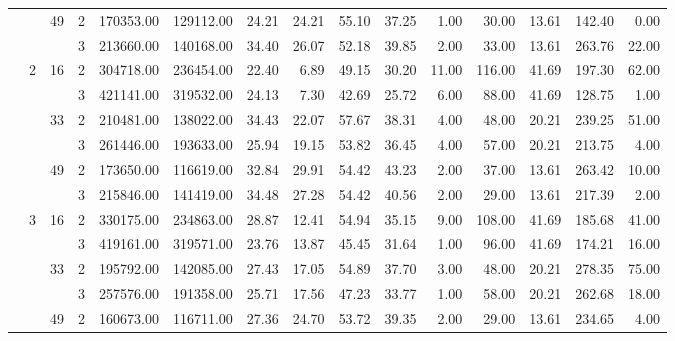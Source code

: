 \begin{tabular}{llllrrrrrrrrrrr}
\cline{3-15}
                &   & \multirow{2}{*}{49} & 2 & 170353.00 & 129112.00 & 24.21 &   24.21 &   55.10 &   37.25 &    1.00 &   30.00 &   13.61 & 142.40 &     0.00 \\
                &   &    & 3 & 213660.00 & 140168.00 & 34.40 &   26.07 &   52.18 &   39.85 &    2.00 &   33.00 &   13.61 & 263.76 &    22.00 \\
\cline{2-15}
\cline{3-15}
                & \multirow{6}{*}{2} & \multirow{2}{*}{16} & 2 & 304718.00 & 236454.00 & 22.40 &    6.89 &   49.15 &   30.20 &   11.00 &  116.00 &   41.69 & 197.30 &    62.00 \\
                &   &    & 3 & 421141.00 & 319532.00 & 24.13 &    7.30 &   42.69 &   25.72 &    6.00 &   88.00 &   41.69 & 128.75 &     1.00 \\
\cline{3-15}
                &   & \multirow{2}{*}{33} & 2 & 210481.00 & 138022.00 & 34.43 &   22.07 &   57.67 &   38.31 &    4.00 &   48.00 &   20.21 & 239.25 &    51.00 \\
                &   &    & 3 & 261446.00 & 193633.00 & 25.94 &   19.15 &   53.82 &   36.45 &    4.00 &   57.00 &   20.21 & 213.75 &     4.00 \\
\cline{3-15}
                &   & \multirow{2}{*}{49} & 2 & 173650.00 & 116619.00 & 32.84 &   29.91 &   54.42 &   43.23 &    2.00 &   37.00 &   13.61 & 263.42 &    10.00 \\
                &   &    & 3 & 215846.00 & 141419.00 & 34.48 &   27.28 &   54.42 &   40.56 &    2.00 &   29.00 &   13.61 & 217.39 &     2.00 \\
\cline{2-15}
\cline{3-15}
                & \multirow{6}{*}{3} & \multirow{2}{*}{16} & 2 & 330175.00 & 234863.00 & 28.87 &   12.41 &   54.94 &   35.15 &    9.00 &  108.00 &   41.69 & 185.68 &    41.00 \\
                &   &    & 3 & 419161.00 & 319571.00 & 23.76 &   13.87 &   45.45 &   31.64 &    1.00 &   96.00 &   41.69 & 174.21 &    16.00 \\
\cline{3-15}
                &   & \multirow{2}{*}{33} & 2 & 195792.00 & 142085.00 & 27.43 &   17.05 &   54.89 &   37.70 &    3.00 &   48.00 &   20.21 & 278.35 &    75.00 \\
                &   &    & 3 & 257576.00 & 191358.00 & 25.71 &   17.56 &   47.23 &   33.77 &    1.00 &   58.00 &   20.21 & 262.68 &    18.00 \\
\cline{3-15}
                &   & \multirow{2}{*}{49} & 2 & 160673.00 & 116711.00 & 27.36 &   24.70 &   53.72 &   39.35 &    2.00 &   29.00 &   13.61 & 234.65 &     4.00 \\

\end{tabular}
